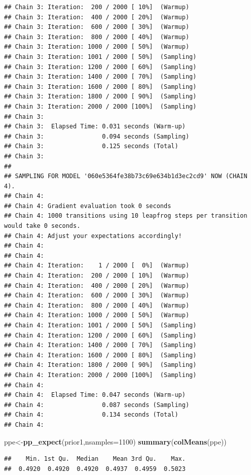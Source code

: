 \documentclass[]{article}
\newenvironment{Shaded}{\begin{snugshade}}{\end{snugshade}}
\newcommand{\DataTypeTok}[1]{\textcolor[rgb]{0.13,0.29,0.53}{#1}}
\newcommand{\DecValTok}[1]{\textcolor[rgb]{0.00,0.00,0.81}{#1}}
\newcommand{\KeywordTok}[1]{\textcolor[rgb]{0.13,0.29,0.53}{\textbf{#1}}}
\newcommand{\NormalTok}[1]{#1}
\begin{document}
\begin{verbatim}
## Chain 3: Iteration:  200 / 2000 [ 10%]  (Warmup)
## Chain 3: Iteration:  400 / 2000 [ 20%]  (Warmup)
## Chain 3: Iteration:  600 / 2000 [ 30%]  (Warmup)
## Chain 3: Iteration:  800 / 2000 [ 40%]  (Warmup)
## Chain 3: Iteration: 1000 / 2000 [ 50%]  (Warmup)
## Chain 3: Iteration: 1001 / 2000 [ 50%]  (Sampling)
## Chain 3: Iteration: 1200 / 2000 [ 60%]  (Sampling)
## Chain 3: Iteration: 1400 / 2000 [ 70%]  (Sampling)
## Chain 3: Iteration: 1600 / 2000 [ 80%]  (Sampling)
## Chain 3: Iteration: 1800 / 2000 [ 90%]  (Sampling)
## Chain 3: Iteration: 2000 / 2000 [100%]  (Sampling)
## Chain 3: 
## Chain 3:  Elapsed Time: 0.031 seconds (Warm-up)
## Chain 3:                0.094 seconds (Sampling)
## Chain 3:                0.125 seconds (Total)
## Chain 3: 
## 
## SAMPLING FOR MODEL '060e5364fe38b73c69e634b1d3ec2cd9' NOW (CHAIN 4).
## Chain 4: 
## Chain 4: Gradient evaluation took 0 seconds
## Chain 4: 1000 transitions using 10 leapfrog steps per transition would take 0 seconds.
## Chain 4: Adjust your expectations accordingly!
## Chain 4: 
## Chain 4: 
## Chain 4: Iteration:    1 / 2000 [  0%]  (Warmup)
## Chain 4: Iteration:  200 / 2000 [ 10%]  (Warmup)
## Chain 4: Iteration:  400 / 2000 [ 20%]  (Warmup)
## Chain 4: Iteration:  600 / 2000 [ 30%]  (Warmup)
## Chain 4: Iteration:  800 / 2000 [ 40%]  (Warmup)
## Chain 4: Iteration: 1000 / 2000 [ 50%]  (Warmup)
## Chain 4: Iteration: 1001 / 2000 [ 50%]  (Sampling)
## Chain 4: Iteration: 1200 / 2000 [ 60%]  (Sampling)
## Chain 4: Iteration: 1400 / 2000 [ 70%]  (Sampling)
## Chain 4: Iteration: 1600 / 2000 [ 80%]  (Sampling)
## Chain 4: Iteration: 1800 / 2000 [ 90%]  (Sampling)
## Chain 4: Iteration: 2000 / 2000 [100%]  (Sampling)
## Chain 4: 
## Chain 4:  Elapsed Time: 0.047 seconds (Warm-up)
## Chain 4:                0.087 seconds (Sampling)
## Chain 4:                0.134 seconds (Total)
## Chain 4:
\end{verbatim}

\begin{Shaded}
\begin{Highlighting}[]
\NormalTok{ppe<-}\KeywordTok{pp_expect}\NormalTok{(prior1,}\DataTypeTok{nsamples=}\DecValTok{1100}\NormalTok{)}
\KeywordTok{summary}\NormalTok{(}\KeywordTok{colMeans}\NormalTok{(ppe))}
\end{Highlighting}
\end{Shaded}

\begin{verbatim}
##    Min. 1st Qu.  Median    Mean 3rd Qu.    Max. 
##  0.4920  0.4920  0.4920  0.4937  0.4959  0.5023
\end{verbatim}
\end{document}
